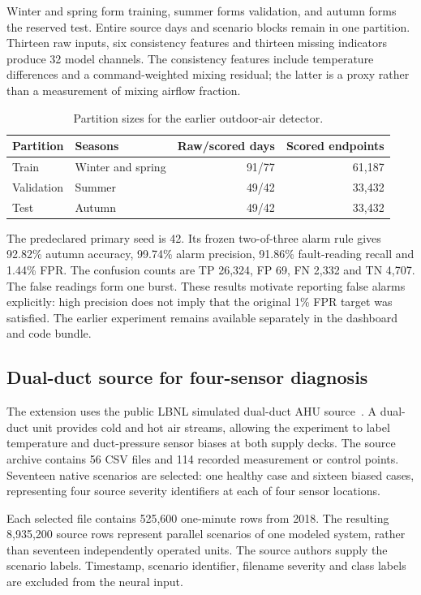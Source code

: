 Winter and spring form training, summer forms validation, and autumn forms the reserved test. Entire source days and scenario blocks remain in one partition. Thirteen raw inputs, six consistency features and thirteen missing indicators produce 32 model channels. The consistency features include temperature differences and a command-weighted mixing residual; the latter is a proxy rather than a measurement of mixing airflow fraction.

\begin{table}[htbp]\centering\small
\caption{Partition sizes for the earlier outdoor-air detector.}\label{tab:old-split}
\begin{tabularx}{\linewidth}{l X r r}
\toprule
Partition & Seasons & Raw/scored days & Scored endpoints \\
\midrule
Train & Winter and spring & 91/77 & 61,187 \\
Validation & Summer & 49/42 & 33,432 \\
Test & Autumn & 49/42 & 33,432 \\
\bottomrule\end{tabularx}
\end{table}

The predeclared primary seed is 42. Its frozen two-of-three alarm rule gives 92.82\% autumn accuracy, 99.74\% alarm precision, 91.86\% fault-reading recall and 1.44\% FPR. The confusion counts are TP 26,324, FP 69, FN 2,332 and TN 4,707. The false readings form one burst. These results motivate reporting false alarms explicitly: high precision does not imply that the original 1\% FPR target was satisfied. The earlier experiment remains available separately in the dashboard and code bundle.

\subsection{Dual-duct source for four-sensor diagnosis}
The extension uses the public LBNL simulated dual-duct AHU source~\cite{lbnl2022,granderson2023}. A dual-duct unit provides cold and hot air streams, allowing the experiment to label temperature and duct-pressure sensor biases at both supply decks. The source archive contains 56 CSV files and 114 recorded measurement or control points. Seventeen native scenarios are selected: one healthy case and sixteen biased cases, representing four source severity identifiers at each of four sensor locations.

Each selected file contains 525,600 one-minute rows from 2018. The resulting 8,935,200 source rows represent parallel scenarios of one modeled system, rather than seventeen independently operated units. The source authors supply the scenario labels. Timestamp, scenario identifier, filename severity and class labels are excluded from the neural input.

